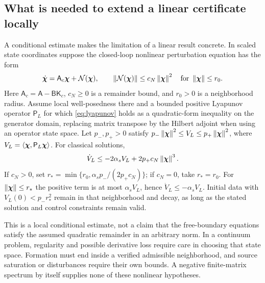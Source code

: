 \subsection{What is needed to extend a linear certificate locally}
A conditional estimate makes the limitation of a linear result concrete.
In scaled state coordinates suppose the closed-loop nonlinear perturbation
equation has the form
\begin{equation}
 \dot{\bm\chi}=\mathsf A_c\bm\chi+\mathcal N(\bm\chi),
 \qquad \left\lVert\mathcal N(\bm\chi)\right\rVert\leq c_N\left\lVert\bm\chi\right\rVert^2
              \quad\text{for }\left\lVert\bm\chi\right\rVert\leq r_0.
 \label{eq:nonlinear-remainder}
\end{equation}
Here $\mathsf A_c=\mathsf A-\mathsf B\mathsf K_c$, $c_N\geq0$ is a
remainder bound, and $r_0>0$ is a neighborhood radius. Assume local
well-posedness there and a bounded positive Lyapunov operator $\mathsf P_L$
for which \cref{eq:lyapunov} holds as a quadratic-form inequality on the
generator domain, replacing matrix transpose by the Hilbert adjoint when
using an operator state space. Let $p_-,p_+>0$ satisfy
$p_-\left\lVert\bm\chi\right\rVert^2\leq V_L\leq p_+\left\lVert\bm\chi\right\rVert^2$, where
$V_L=\left\langle\bm\chi,\mathsf P_L\bm\chi\right\rangle$. For classical solutions,
\begin{equation}
 \dot V_L\leq-2\alpha_s V_L
                   +2p_+c_N\left\lVert\bm\chi\right\rVert^3.
 \label{eq:nonlinear-lyapunov-bound}
\end{equation}
If $c_N>0$, set
$r_*=\min\{r_0,\alpha_s p_-/(2p_+c_N)\}$; if $c_N=0$, take $r_*=r_0$.
For $\left\lVert\bm\chi\right\rVert\leq r_*$ the positive term is at most
$\alpha_s V_L$, hence $\dot V_L\leq-\alpha_s V_L$. Initial data with
$V_L(0)<p_-r_*^2$ remain in that neighborhood and decay, as long as the
stated solution and control constraints remain valid.

This is a local conditional estimate, not a claim that the free-boundary
equations satisfy the assumed quadratic remainder in an arbitrary norm.
In a continuum problem, regularity and possible derivative loss require
care in choosing that state space. Formation must end inside a verified
admissible neighborhood, and source saturation or disturbances require
their own bounds. A negative finite-matrix spectrum by itself supplies none
of these nonlinear hypotheses.
